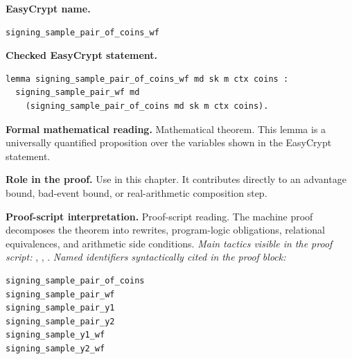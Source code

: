 \begin{formaltheorem}
\noindent\textbf{EasyCrypt name.}
\begin{lstlisting}[language=EasyCrypt,basicstyle=\ttfamily\scriptsize]
signing_sample_pair_of_coins_wf
\end{lstlisting}
\noindent\textbf{Checked EasyCrypt statement.}
\begin{lstlisting}[language=EasyCrypt,basicstyle=\ttfamily\scriptsize]
lemma signing_sample_pair_of_coins_wf md sk m ctx coins :
  signing_sample_pair_wf md
    (signing_sample_pair_of_coins md sk m ctx coins).
\end{lstlisting}
\noindent\textbf{Formal mathematical reading.}
Mathematical theorem. This lemma is a universally quantified proposition over the variables shown in the EasyCrypt statement.

\noindent\textbf{Role in the proof.}
Use in this chapter. It contributes directly to an advantage bound, bad-event bound, or real-arithmetic composition step.

\noindent\textbf{Proof-script interpretation.}
Proof-script reading. The machine proof decomposes the theorem into rewrites, program-logic obligations, relational equivalences, and arithmetic side conditions.
\emph{Main tactics visible in the proof script:} , , .
\emph{Named identifiers syntactically cited in the proof block:}
\begin{lstlisting}[language=EasyCrypt,basicstyle=\ttfamily\scriptsize]
signing_sample_pair_of_coins
signing_sample_pair_wf
signing_sample_pair_y1
signing_sample_pair_y2
signing_sample_y1_wf
signing_sample_y2_wf
\end{lstlisting}

\end{formaltheorem}

